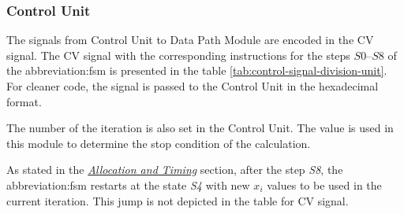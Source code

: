 \documentclass[a4paper, twoside, 11pt]{article}
\newcommand{\fbar}{\FloatBarrier}
\begin{document}
\fbar
\subsubsection{Control Unit}\label{subsubsection:division-control-unit}
The signals from Control Unit to Data Path Module are encoded in the CV signal. The CV signal with the corresponding instructions for the steps $S0$–$S8$ of the \gls{abbreviation:fsm} is presented in the table \ref{tab:control-signal-division-unit}. For cleaner code, the signal is passed to the Control Unit in the hexadecimal format.\par
The number of the iteration is also set in the Control Unit. The value is used in this module to determine the stop condition of the calculation.\par
As stated in the \hyperref[subsubsec:division-allocation-and-timing]{\textit{Allocation and Timing}} section, after the step \textit{S8}, the \gls{abbreviation:fsm} restarts at the state \textit{S4} with new $x_i$ values to be used in the current iteration. This jump is not depicted in the table for CV signal.
\end{document}
